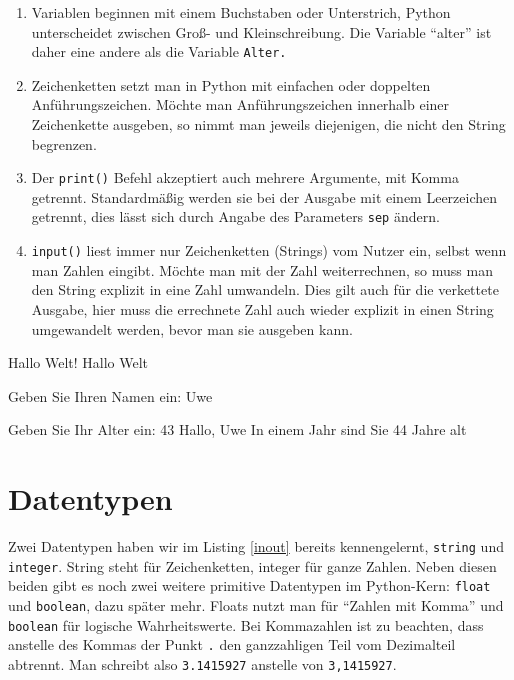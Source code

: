 \documentclass[12pt,ngerman]{scrreprt}
\newcommand{\ta}[1]{\textattachfile[color=1 0 0]{#1}{\faFilePowerpointO}}
\newcommand{\pypyl}[3]{}
\begin{document}
\begin{enumerate}
\item Variablen beginnen mit einem Buchstaben oder Unterstrich, Python unterscheidet zwischen Groß- und Kleinschreibung. Die Variable \enquote{alter} ist daher eine andere als die Variable \texttt{Alter.}
\item Zeichenketten setzt man in Python mit einfachen oder doppelten Anführungszeichen. Möchte man Anführungszeichen innerhalb einer Zeichenkette ausgeben, so nimmt man jeweils diejenigen, die nicht den String begrenzen. 
\item Der \texttt{print()} Befehl akzeptiert auch mehrere Argumente, mit Komma getrennt. Standardmäßig werden sie bei der Ausgabe mit einem Leerzeichen getrennt, dies lässt sich durch Angabe des Parameters \texttt{sep} ändern.
\item \texttt{input()} liest immer nur Zeichenketten (Strings) vom Nutzer ein, selbst wenn man Zahlen eingibt. Möchte man mit der Zahl weiterrechnen, so muss man den String explizit in eine Zahl umwandeln. Dies gilt auch für die verkettete Ausgabe, hier muss die errechnete Zahl auch wieder explizit in einen String umgewandelt werden, bevor man sie ausgeben kann.
\end{enumerate} 




\pypyl{Eingabe und Ausgabe}{Codes/inout.py}{inout}


\begin{ausgabe}[caption={Ausgabe von Listing \ref{inout}}]
Hallo Welt!
Hallo Welt

Geben Sie Ihren Namen ein: Uwe

Geben Sie Ihr Alter ein: 43
Hallo, Uwe
In einem Jahr sind Sie 44 Jahre alt
\end{ausgabe}

\section{Datentypen}

Zwei Datentypen haben wir im Listing \ref{inout} bereits kennengelernt, \texttt{string} und \texttt{integer}. String steht für Zeichenketten, integer für ganze Zahlen. Neben diesen beiden gibt es noch zwei weitere primitive Datentypen im Python-Kern: \texttt{float} und \texttt{boolean}, dazu später mehr. Floats nutzt man für \enquote{Zahlen mit Komma} und \texttt{boolean} für logische Wahrheitswerte. Bei Kommazahlen ist zu beachten, dass anstelle des Kommas der Punkt \texttt{.}  den ganzzahligen Teil vom Dezimalteil abtrennt. Man schreibt also \texttt{3.1415927} anstelle von \texttt{3,1415927}. 
\end{document}

